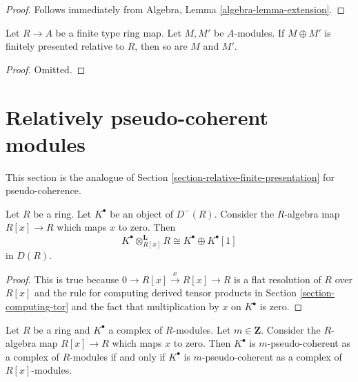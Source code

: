 \begin{proof}
Follows immediately from
Algebra, Lemma \ref{algebra-lemma-extension}.
\end{proof}

\begin{lemma}
\label{lemma-sum-relatively-finite-presentation}
Let $R \to A$ be a finite type ring map.
Let $M, M'$ be $A$-modules. If $M \oplus M'$ is
finitely presented relative to $R$, then so are $M$ and $M'$.
\end{lemma}

\begin{proof}
Omitted.
\end{proof}






\section{Relatively pseudo-coherent modules}
\label{section-relative-pseudo-coherent}

\noindent
This section is the analogue of
Section \ref{section-relative-finite-presentation}
for pseudo-coherence.

\begin{lemma}
\label{lemma-pull-push}
Let $R$ be a ring. Let $K^\bullet$ be an object of $D^{-}(R)$.
Consider the $R$-algebra map $R[x] \to R$ which maps $x$ to zero. Then
$$
K^\bullet \otimes_{R[x]}^{\mathbf{L}} R \cong K^\bullet \oplus K^\bullet[1]
$$
in $D(R)$.
\end{lemma}

\begin{proof}
This is true because $0 \to R[x] \xrightarrow{x} R[x] \to R$
is a flat resolution of $R$ over $R[x]$ and the rule for computing
derived tensor products in
Section \ref{section-computing-tor}
and the fact that multiplication by $x$ on $K^\bullet$ is zero.
\end{proof}

\begin{lemma}
\label{lemma-add-variable-pseudo-coherent}
Let $R$ be a ring and $K^\bullet$ a complex of $R$-modules.
Let $m \in \mathbf{Z}$. Consider the $R$-algebra map $R[x] \to R$
which maps $x$ to zero. Then $K^\bullet$ is $m$-pseudo-coherent as
a complex of $R$-modules if and only if $K^\bullet$ is $m$-pseudo-coherent
as a complex of $R[x]$-modules.
\end{lemma}


